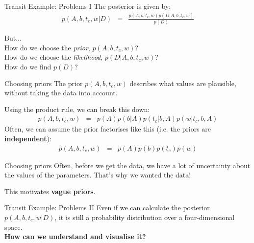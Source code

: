\begin{frame}[fragile, t]{Transit Example: Problems I}
The posterior is given by:
\begin{eqnarray*}
p(A, b, t_c, w | D) &=& \frac{p(A, b, t_c, w)p(D | A, b, t_c, w)}{p(D)}
\end{eqnarray*}

But...\\
How do we choose the {\it prior}, $p(A, b, t_c, w)$?\\
How do we choose the {\it likelihood}, $p(D | A, b, t_c, w)$?\\
How do we find $p(D)$?
\end{frame}


\begin{frame}[t]{Choosing priors}
The prior $p(A, b, t_c, w)$
describes what values are plausible, without taking the data into account.

Using the product rule, we can break this down:
\begin{eqnarray*}
p(A, b, t_c, w) &=& p(A) p(b | A) p(t_c | b, A) p(w | t_c, b, A)
\end{eqnarray*}
Often, we can assume the prior factorises like this (i.e. the priors are
{\bf independent}):
\begin{eqnarray*}
p(A, b, t_c, w) &=& p(A) p(b) p(t_c) p(w)
\end{eqnarray*}


\end{frame}


\begin{frame}[t]{Choosing priors}
Often, before we get the data, we have a lot of uncertainty about the
values of the parameters. That's why we wanted the data!

This motivates {\bf vague priors}.

\end{frame}



\begin{frame}[fragile, t]{Transit Example: Problems II}
Even if we can calculate the posterior $p(A, b, t_c, w | D)$, it is still a
probability distribution over a four-dimensional space.\\
\vspace{20pt}
{\bf How can we understand and visualise it?}
\end{frame}




